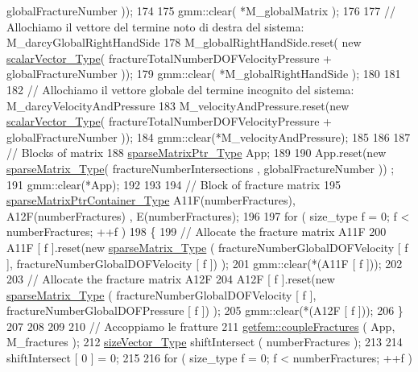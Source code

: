 \begin{DoxyCode}
      globalFractureNumber ));
174     
175     gmm::clear( *M\_globalMatrix );
176     
177     \textcolor{comment}{// Allochiamo il vettore del termine noto di destra del sistema: M\_darcyGlobalRightHandSide}
178     M\_globalRightHandSide.reset( \textcolor{keyword}{new} \hyperlink{Core_8h_a4e75b5863535ba1dd79942de2846eff0}{scalarVector\_Type}( 
      fractureTotalNumberDOFVelocityPressure + globalFractureNumber ));
179     gmm::clear( *M\_globalRightHandSide );
180 
181     
182     \textcolor{comment}{// Allochiamo il vettore globale del termine incognito del sistema: M\_darcyVelocityAndPressure}
183     M\_velocityAndPressure.reset(\textcolor{keyword}{new} \hyperlink{Core_8h_a4e75b5863535ba1dd79942de2846eff0}{scalarVector\_Type}( 
      fractureTotalNumberDOFVelocityPressure + globalFractureNumber ));
184     gmm::clear(*M\_velocityAndPressure);
185 
186     
187     \textcolor{comment}{// Blocks of matrix}
188     \hyperlink{Core_8h_a87137a9501b38c724ac80bc955164bb7}{sparseMatrixPtr\_Type}  App;
189 
190     App.reset(\textcolor{keyword}{new} \hyperlink{Core_8h_afba9f623673e2ae32054015bdb5500f9}{sparseMatrix\_Type}( fractureNumberIntersections , globalFractureNumber ))
      ;
191     gmm::clear(*App);
192 
193     
194     \textcolor{comment}{// Block of fracture matrix}
195     \hyperlink{Core_8h_a2f5e086fbce840d40be38c016488fd91}{sparseMatrixPtrContainer\_Type} A11F(numberFractures), A12F(numberFractures)
      , E(numberFractures);
196 
197     \textcolor{keywordflow}{for} ( size\_type f = 0; f < numberFractures; ++f )
198     \{
199         \textcolor{comment}{// Allocate the fracture matrix A11F}
200         A11F [ f ].reset(\textcolor{keyword}{new} \hyperlink{Core_8h_afba9f623673e2ae32054015bdb5500f9}{sparseMatrix\_Type} ( fractureNumberGlobalDOFVelocity [ f ], 
      fractureNumberGlobalDOFVelocity [ f ]) );
201         gmm::clear(*(A11F [ f ]));
202 
203         \textcolor{comment}{// Allocate the fracture matrix A12F}
204         A12F [ f ].reset(\textcolor{keyword}{new} \hyperlink{Core_8h_afba9f623673e2ae32054015bdb5500f9}{sparseMatrix\_Type} ( fractureNumberGlobalDOFVelocity [ f ], 
      fractureNumberGlobalDOFPressure [ f ]) );
205         gmm::clear(*(A12F [ f ]));
206     \}
207 
208  
209     
210     \textcolor{comment}{// Accoppiamo le fratture}
211     \hyperlink{namespacegetfem_a9a0b9f7498668cda8b547b10ac914a34}{getfem::coupleFractures} ( App, M\_fractures );
212     \hyperlink{Core_8h_a83c51913d041a5001e8683434c09857f}{sizeVector\_Type} shiftIntersect ( numberFractures );
213     
214     shiftIntersect [ 0 ] = 0;
215     
216     \textcolor{keywordflow}{for} ( size\_type f = 0; f < numberFractures; ++f )

\end{DoxyCode}
